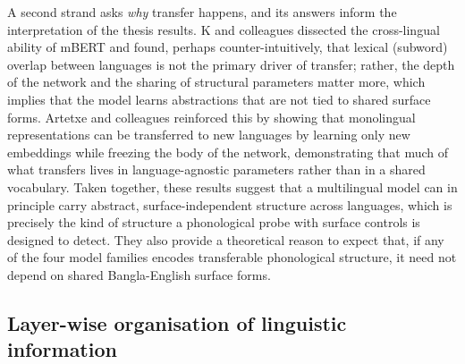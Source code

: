 A second strand asks \emph{why} transfer happens, and its answers inform the interpretation of the thesis results. K and colleagues \cite{k2020crosslingual} dissected the cross-lingual ability of mBERT and found, perhaps counter-intuitively, that lexical (subword) overlap between languages is not the primary driver of transfer; rather, the depth of the network and the sharing of structural parameters matter more, which implies that the model learns abstractions that are not tied to shared surface forms. Artetxe and colleagues \cite{artetxe2020crosslingual} reinforced this by showing that monolingual representations can be transferred to new languages by learning only new embeddings while freezing the body of the network, demonstrating that much of what transfers lives in language-agnostic parameters rather than in a shared vocabulary. Taken together, these results suggest that a multilingual model can in principle carry abstract, surface-independent structure across languages, which is precisely the kind of structure a phonological probe with surface controls is designed to detect. They also provide a theoretical reason to expect that, if any of the four model families encodes transferable phonological structure, it need not depend on shared Bangla-English surface forms.

\subsection{Layer-wise organisation of linguistic information}

